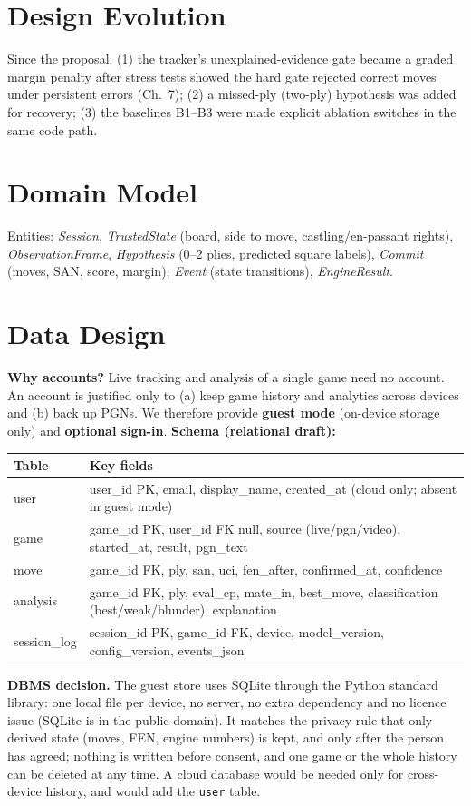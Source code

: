\section{Design Evolution}
Since the proposal: (1) the tracker's unexplained-evidence gate became a graded margin penalty after stress tests
showed the hard gate rejected correct moves under persistent errors (Ch.~7); (2) a missed-ply (two-ply) hypothesis
was added for recovery; (3) the baselines B1--B3 were made explicit ablation switches in the same code path.

\section{Domain Model}
Entities: \emph{Session}, \emph{TrustedState} (board, side to move, castling/en-passant rights), \emph{ObservationFrame},
\emph{Hypothesis} (0--2 plies, predicted square labels), \emph{Commit} (moves, SAN, score, margin), \emph{Event} (state
transitions), \emph{EngineResult}. 

\section{Data Design}\label{sec:data}
\textbf{Why accounts?} Live tracking and analysis of a single game need no account. An account is justified only
to (a) keep game history and analytics across devices and (b) back up PGNs. We therefore provide \textbf{guest mode}
(on-device storage only) and \textbf{optional sign-in}.
\textbf{Schema (relational draft):}
\begin{longtable}{p{}p{}}
\toprule Table & Key fields\\ \midrule
user & user\_id PK, email, display\_name, created\_at (cloud only; absent in guest mode)\\
game & game\_id PK, user\_id FK null, source (live/pgn/video), started\_at, result, pgn\_text\\
move & game\_id FK, ply, san, uci, fen\_after, confirmed\_at, confidence\\
analysis & game\_id FK, ply, eval\_cp, mate\_in, best\_move, classification (best/weak/blunder), explanation\\
session\_log & session\_id PK, game\_id FK, device, model\_version, config\_version, events\_json\\
\bottomrule
\end{longtable}
\textbf{DBMS decision.} The guest store uses SQLite through the Python standard library: one local file per device, no
server, no extra dependency and no licence issue (SQLite is in the public domain). It matches the privacy rule that only
derived state (moves, FEN, engine numbers) is kept, and only after the person has agreed; nothing is written before
consent, and one game or the whole history can be deleted at any time. A cloud database would be needed only for
cross-device history, and would add the \texttt{user} table. 

